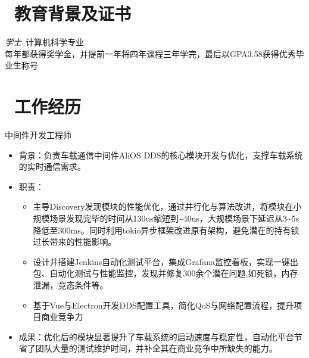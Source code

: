 \documentclass{resume}
\begin{document}


 
\section{\faGraduationCap\  教育背景及证书}
\textit{学士}\ 计算机科学专业 \\
每年都获得奖学金，并提前一年将四年课程三年学完，最后以GPA3.58获得优秀毕业生称号


\section{\faUsers\ 工作经历}
 \begin{onehalfspacing}
中间件开发工程师
\begin{itemize}
  \item 背景：负责车载通信中间件AliOS DDS的核心模块开发与优化，支撑车载系统的实时通信需求。
  \item 职责：
    \begin{itemize}
      \item 主导Discovery发现模块的性能优化，通过并行化与算法改进，将模块在小规模场景发现完毕的时间从130us缩短到\textasciitilde40us，大规模场景下延迟从3\textasciitilde5s降低至300ms。同时利用tokio异步框架改进原有架构，避免潜在的持有锁过长带来的性能影响。
      \item 设计并搭建Jenkins自动化测试平台，集成Grafana监控看板，实现一键出包、自动化测试与性能监控，发现并修复300余个潜在问题,如死锁，内存泄漏，竞态条件等。
      \item 基于Vue与Electron开发DDS配置工具，简化QoS与网络配置流程，提升项目商业竞争力
    \end{itemize}
  \item 成果：优化后的模块显著提升了车载系统的启动速度与稳定性，自动化平台节省了团队大量的测试维护时间，并补全其在商业竞争中所缺失的能力。
\end{itemize}
 \end{onehalfspacing}
\end{document}
